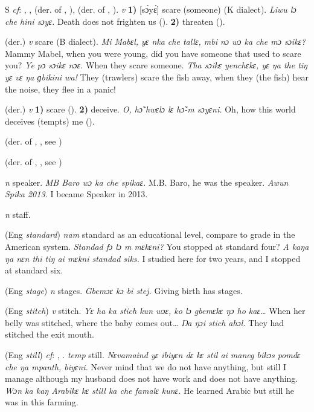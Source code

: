 \begin{letter}{S}
 \textit{cf}: , ,  (der. of , ),  (der. of , ). \textit{v} \textbf{1)} [sɔ́yɛ́] scare (someone) (K dialect). \textit{Liwu lɔ che hini sɔyɛ.} Death does not frighten us (\citealt{Pichl1967}). \textbf{2)} threaten (\citealt{Pichl1967}). 

 (der.) \textit{v} scare (B dialect). \textit{Mi Mabɛl, yɛ nka che tallɛ, mbi nɔ wɔ ka che mɔ sɔikɛ?} Mammy Mabel, when you were young, did you have someone that used to scare you? \textit{Ye pɔ sɔikɛ nɔɛ.} When they scare someone. \textit{Tha sɔikɛ yenchɛkɛ, yɛ ŋa the tiŋ yɛ vɛ ŋa ɡbikini wa!} They (trawlers) scare the fish away, when they (the fish) hear the noise, they flee in a panic!

 (der.) \textit{v} \textbf{1)} scare (\citealt{Pichl1967}). \textbf{2)} deceive. \textit{O, hɔ̃ hwɛlɔ lɛ hɔ̃-m sɔyɛni.} Oh, how this world deceives (tempts) me (\citealt{Pichl1967}). 

 (der. of , , see ) 

 (der. of , , see ) 

 \textit{n} speaker. \textit{MB Baro wɔ ka che spikaɛ.} M.B. Baro, he was the speaker. \textit{Awun Spika 2013.} I became Speaker in 2013.

 \textit{n} staff.

 (Eng \textit{standard}) \textit{nam} standard as an educational level, compare to grade in the American system. \textit{Standad fɔ lɔ m mɛkɛni?} You stopped at standard four? \textit{A kaŋa ŋa nɛn thi tiŋ ai mɛkni standad siks.} I studied here for two years, and I stopped at standard six. 

 (Eng \textit{stage}) \textit{n} stages. \textit{Gbemɔɛ kɔ bi stej.} Giving birth has stages.

 (Eng \textit{stitch}) \textit{v} stitch. \textit{Yɛ ha ka stich kun wɔɛ, ko lɔ gbemɛkɛ ŋɔ ho kaɛ…} When her belly was stitched, where the baby comes out… \textit{Ŋa ŋɔi stich ahɔl.} They had stitched the exit mouth.

 (Eng \textit{still}) \textit{cf}: , . \textit{temp} still. \textit{Nɛvamaind yɛ ibiyɛn dɛ kɛ stil ai maneg bikɔs pomdɛ che ŋa mpanth, biyɛni.} Never mind that we do not have anything, but still I manage although my husband does not have work and does not have anything. \textit{Wɔn ka kaŋ Arabikɛ kɛ still ka che famalɛ kunɛ.} He learned Arabic but still he was in this farming.


\end{letter}
